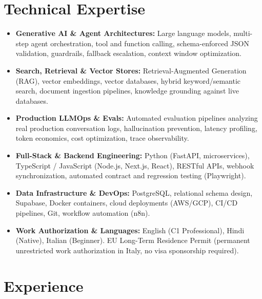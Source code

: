 \documentclass[10pt,a4paper]{article}
\begin{document}
\section{Technical Expertise}
\begin{itemize}
  \item \textbf{Generative AI \& Agent Architectures:} Large language models, multi-step agent orchestration, tool and function calling, schema-enforced JSON validation, guardrails, fallback escalation, context window optimization.
  \item \textbf{Search, Retrieval \& Vector Stores:} Retrieval-Augmented Generation (RAG), vector embeddings, vector databases, hybrid keyword/semantic search, document ingestion pipelines, knowledge grounding against live databases.
  \item \textbf{Production LLMOps \& Evals:} Automated evaluation pipelines analyzing real production conversation logs, hallucination prevention, latency profiling, token economics, cost optimization, trace observability.
  \item \textbf{Full-Stack \& Backend Engineering:} Python (FastAPI, microservices), TypeScript / JavaScript (Node.js, Next.js, React), RESTful APIs, webhook synchronization, automated contract and regression testing (Playwright).
  \item \textbf{Data Infrastructure \& DevOps:} PostgreSQL, relational schema design, Supabase, Docker containers, cloud deployments (AWS/GCP), CI/CD pipelines, Git, workflow automation (n8n).
  \item \textbf{Work Authorization \& Languages:} English (C1 Professional), Hindi (Native), Italian (Beginner). EU Long-Term Residence Permit (permanent unrestricted work authorization in Italy, no visa sponsorship required).
\end{itemize}

\section{Experience}
\end{document}
